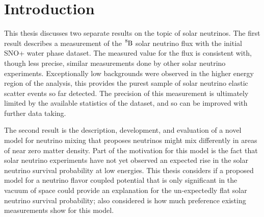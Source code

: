 
\chapter{Introduction}

\ifpdf
    \graphicspath{{physics/figures/PNG/}{physics/figures/PDF/}{physics/figures/}}
\else
    \graphicspath{{physics/figures/EPS/}{physics/figures/}}
\fi

This thesis discusses two separate results on the topic of solar neutrinos.
The first result describes a measurement of the $\ce{^{8}B}$ solar
neutrino flux with the initial SNO+ water phase dataset.
The measured value for the flux is consistent with, though less precise, similar measurements
done by other solar neutrino experiments.
Exceptionally low backgrounds were observed in the higher energy region of the
analysis, this provides the purest sample of solar neutrino elastic scatter 
events so far detected.
The precision of this measurement is ultimately limited by the available
statistics of the dataset, and so can be improved with further data taking.

The second result is the description, development, and evaluation of a novel
model for neutrino mixing that proposes neutrinos might mix differently in
areas of near zero matter density.
Part of the motivation for this model is the fact that solar neutrino experiments have
not yet observed an expected rise in the solar neutrino survival probability
at low energies.
This thesis considers if a proposed model for a neutrino flavor coupled potential
that is only significant in the vacuum of space
could provide an explanation for the un-expectedly flat solar neutrino
survival probability;
also considered is how much preference existing measurements show
for this model.




